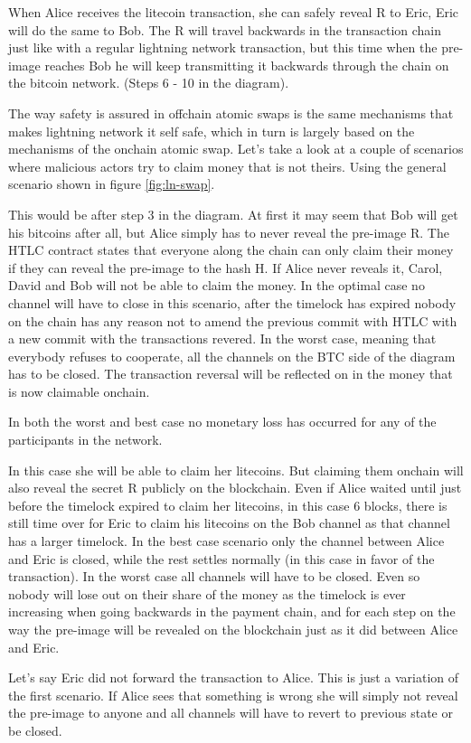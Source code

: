 When Alice receives the litecoin transaction, she can safely reveal R to Eric, Eric will do the same to Bob. The R will travel backwards in the transaction chain just like with a regular lightning network transaction, but this time when the pre-image reaches Bob he will keep transmitting it backwards through the chain on the bitcoin network. (Steps 6 - 10 in the diagram).

The way safety is assured in offchain atomic swaps is the same mechanisms that makes lightning network it self safe, which in turn is largely based on the mechanisms of the onchain atomic swap. 
Let's take a look at a couple of scenarios where malicious actors try to claim money that is not theirs. Using the general scenario shown in figure \ref{fig:ln-swap}.

This would be after step 3 in the diagram. At first it may seem that Bob will get his bitcoins after all, but Alice simply has to never reveal the pre-image R. The HTLC contract states that everyone along the chain can only claim their money if they can reveal the pre-image to the hash H. If Alice never reveals it, Carol, David and Bob will not be able to claim the money. In the optimal case no channel will have to close in this scenario, after the timelock has expired nobody on the chain has any reason not to amend the previous commit with HTLC with a new commit with the transactions revered. In the worst case, meaning that everybody refuses to cooperate, all the channels on the BTC side of the diagram has to be closed. The transaction reversal will be reflected on in the money that is now claimable onchain.

In both the worst and best case no monetary loss has occurred for any of the participants in the network.

In this case she will be able to claim her litecoins. But claiming them onchain will also reveal the secret R publicly on the blockchain. Even if Alice waited until just before the timelock expired to claim her litecoins, in this case 6 blocks, there is still time over for Eric to claim his litecoins on the Bob channel as that channel has a larger timelock. In the best case scenario only the channel between Alice and Eric is closed, while the rest settles normally (in this case in favor of the transaction). In the worst case all channels will have to be closed. Even so nobody will lose out on their share of the money as the timelock is ever increasing when going backwards in the payment chain, and for each step on the way the pre-image will be revealed on the blockchain just as it did between Alice and Eric. 

Let's say Eric did not forward the transaction to Alice. This is just a variation of the first scenario. If Alice sees that something is wrong she will simply not reveal the pre-image to anyone and all channels will have to revert to previous state or be closed.